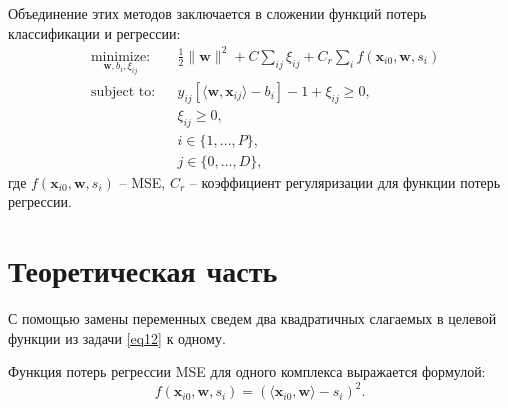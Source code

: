 \documentclass[12pt,twoside]{article}
\begin{document}
Объединение этих методов заключается в сложении функций потерь классификации и регрессии:
\begin{equation}\label{eq12}
\begin{aligned}
& \underset{\mathbf{w}, b_i, \xi_{ij}}{\text{minimize:}}
& & \frac{1}{2} \|\mathbf{w}\|^2 + C\sum\limits_{ij}\xi_{ij} + C_{r}\sum\limits_{i} f(\mathbf{x}_{i0},\mathbf{w}, s_i) \\
& \text{subject to:}
& & y_{ij}[\langle\mathbf{w},\mathbf{x}_{ij}\rangle - b_i]-1+\xi_{ij} \geq 0, \\
&&& \xi_{ij} \geq 0, \\
&&&i\in\{1,\dots,P\}, \\
&&&j\in\{0,\dots,D\},
\end{aligned}
\end{equation}
где $f(\mathbf{x}_{i0},\mathbf{w}, s_i)$ -- MSE, $C_r$ -- коэффициент регуляризации для функции потерь регрессии. 

\section{Теоретическая часть}
С помощью замены переменных сведем два квадратичных слагаемых в целевой функции из задачи \eqref{eq12} к одному. 

Функция потерь регрессии MSE для одного комплекса выражается формулой:
\begin{equation}\label{eq15}
f({\mathbf{x}}_{i0}, {\mathbf{w}}, s_i) = (\langle{\mathbf{x}}_{i0}, {\mathbf{w}} \rangle - s_i)^2.
\end{equation}
\end{document}
